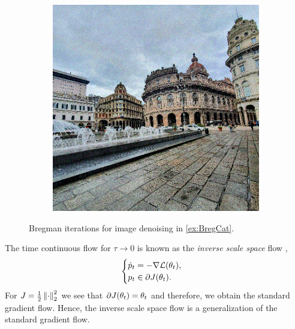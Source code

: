 \begin{figure}
\begin{minipage}{\textwidth}
\begin{subfigure}{.3\textwidth}
%
\end{subfigure}\hfill%
\begin{subfigure}{.3\textwidth}%
\includegraphics[width=\textwidth]{atelier/breg_cat/data.png}
\end{subfigure}%
\end{minipage}%
%
\caption{Bregman iterations for image denoising in \cref{ex:BregCat}.}\label{fig:BregCat}
\end{figure}%
%
%
\noindent
\noindent%
The time continuous flow for $\tau\to 0$ is known as the \emph{inverse scale space} flow \cite{burger2006nonlinear,burger2007inverse},
%
\begin{align*}
\begin{cases}
    \dot{p}_t = - \nabla\mathcal{L}(\theta_t), \\
    p_t \in \partial J(\theta_t).
\end{cases}
\end{align*}
%
For $J=\frac{1}{2}\left\|\cdot\right\|_2^2$ we see that $\partial J(\theta_t) = \theta_t$ and therefore, we obtain the standard gradient flow. Hence, the inverse scale space flow is a generalization of the standard gradient flow. 
%
%
%
